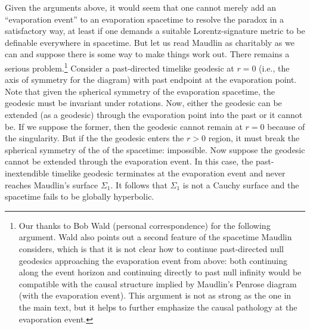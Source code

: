 \documentclass[authoryear,12pt,3p]{jowarticle}
\begin{document}
Given the arguments above, it would seem that one cannot merely add an ``evaporation event'' to an evaporation spacetime to resolve the paradox in a satisfactory way, at least if one demands a suitable Lorentz-signature metric to be definable everywhere in spacetime. But let us read Maudlin as charitably as we can and suppose there is some way to make things work out. There remains a serious problem.\footnote{Our thanks to Bob Wald (personal correspondence) for the following argument.  Wald also points out a second feature of the spacetime Maudlin considers, which is that it is not clear how to continue past-directed null geodesics approaching the evaporation event from above: both continuing along the event horizon and continuing directly to past null infinity would be compatible with the causal structure implied by Maudlin's Penrose diagram (with the evaporation event).  This argument is not as strong as the one in the main text, but it helps to further emphasize the causal pathology at the evaporation event.} Consider a past-directed timelike geodesic at $r=0$ (i.e., the axis of symmetry for the diagram) with past endpoint at the evaporation point. Note that given the spherical symmetry of the evaporation spacetime, the geodesic must be invariant under rotations. Now, either the geodesic can be extended (as a geodesic) through the evaporation point into the past or it cannot be. If we suppose the former, then the geodesic cannot remain at $r=0$ because of the singularity. But if the the geodesic enters the $r> 0$ region, it must break the spherical symmetry of the of the spacetime: impossible. Now suppose the geodesic cannot be extended through the evaporation event. In this case, the past-inextendible timelike geodesic terminates at the evaporation event and never reaches Maudlin's surface $\Sigma_1$. It follows that $\Sigma_1$ is not a Cauchy surface and the spacetime fails to be globally hyperbolic.
\end{document}
